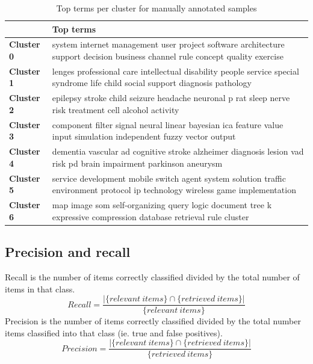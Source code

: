 \begin{table}
\begin{tabular}{|p{2cm}|p{10.5cm}|} 
\hline %
\textbf{ } & \textbf{Top terms} \\ 
\hline 
\textbf{Cluster 0} & system internet management user project software architecture support decision business channel rule concept quality exercise  \\ 
\hline
\hline 
\textbf{Cluster 1} & lenges professional care intellectual disability people service special syndrome life child social support diagnosis pathology  \\ 
\hline
\hline 
\textbf{Cluster 2} & epilepsy stroke child seizure headache neuronal p rat sleep nerve risk treatment cell alcohol activity  \\ 
\hline
\hline 
\textbf{Cluster 3} & component filter signal neural linear bayesian ica feature value input simulation independent fuzzy vector output \\ 
\hline
\hline 
\textbf{Cluster 4} & dementia vascular ad cognitive stroke alzheimer diagnosis lesion vad risk pd brain impairment parkinson aneurysm \\ 
\hline
\hline 
\textbf{Cluster 5} & service development mobile switch agent system solution traffic environment protocol ip technology wireless game implementation \\ 
\hline
\hline 
\textbf{Cluster 6} & map image som self-organizing query logic document tree k expressive compression database retrieval rule cluster \\ 
\hline
\end{tabular} %
\caption{Top terms per cluster for manually annotated samples}
\label{table:topterms}
\end{table} %



\subsection{Precision and recall}
Recall is the number of items correctly classified divided by the 
total number of items in that class.
\begin{equation}
 Recall = \frac{|\{relevant\ items\} \cap \{retrieved\ items\}|} 
{\{relevant\ items\}}
\end{equation}
Precision is the number of items correctly classified divided by 
the total number items classified into that class (ie. true and 
false positives).
\begin{equation}
 Precision = \frac{|\{relevant\ items\} \cap \{retrieved\ 
items\}|} 
{\{retrieved\ items\}}
\end{equation}


